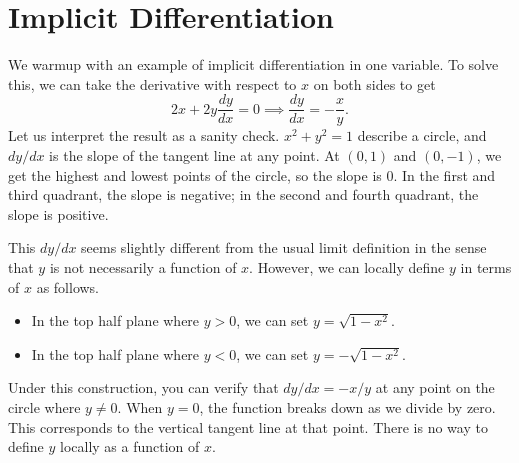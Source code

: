 \section{Implicit Differentiation}
We warmup with an example of implicit differentiation in one variable.
To solve this, we can take the derivative with respect to $x$ on both sides to get \[
2x+2y \frac{dy}{dx}=0 \implies \frac{dy}{dx}=-\frac{x}{y}.
\]
Let us interpret the result as a sanity check. $x^2+y^2=1$ describe a circle, and $dy/dx$ is the slope of the tangent line at any point. At $(0,1)$ and $(0,-1)$, we get the highest and lowest points of the circle, so the slope is $0$. In the first and third quadrant, the slope is negative; in the second and fourth quadrant, the slope is positive.

This $dy/dx$ seems slightly different from the usual limit definition in the sense that $y$ is not necessarily a function of $x$. However, we can locally define $y$ in terms of $x$ as follows. \begin{itemize}
    \item In the top half plane where $y>0$, we can set $y=\sqrt{1-x^2}$.
    \item In the top half plane where $y<0$, we can set $y=-\sqrt{1-x^2}$.
\end{itemize}
Under this construction, you can verify that $dy/dx=-x/y$ at any point on the circle where $y\neq 0$. When $y=0$, the function breaks down as we divide by zero. This corresponds to the vertical tangent line at that point. There is no way to define $y$ locally as a function of $x$. 


